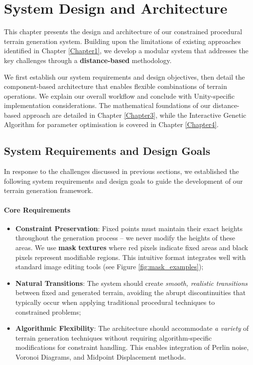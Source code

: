 \chapter{System Design and Architecture}
\label{Chapter2}

This chapter presents the design and architecture of our constrained procedural terrain generation system. Building upon the limitations of existing approaches identified in Chapter \ref{Chapter1}, we develop a modular system that addresses the key challenges through a \textbf{distance-based} methodology.

We first establish our system requirements and design objectives, then detail the component-based architecture that enables flexible combinations of terrain operations. We explain our overall workflow and conclude with Unity-specific implementation considerations. The mathematical foundations of our distance-based approach are detailed in Chapter \ref{Chapter3}, while the Interactive Genetic Algorithm for parameter optimisation is covered in Chapter \ref{Chapter4}.

\section{System Requirements and Design Goals}

In response to the challenges discussed in previous sections, we established the following system requirements and design goals to guide the development of our terrain generation framework.

\subsubsection{Core Requirements}

\begin{itemize}
    \item \textbf{Constraint Preservation}: Fixed points must maintain their exact heights throughout the generation process -- we never modify the heights of these areas. We use \textbf{mask} \textbf{textures} where red pixels indicate fixed areas and black pixels represent modifiable regions. This intuitive format integrates well with standard image editing tools (see Figure \ref{fig:mask_examples});

    \item \textbf{Natural Transitions}: The system should create \textit{smooth, realistic transitions} between fixed and generated terrain, avoiding the abrupt discontinuities that typically occur when applying traditional procedural techniques to constrained problems; 

    \item \textbf{Algorithmic Flexibility}: The architecture should accommodate \textit{a variety} of terrain generation techniques without requiring algorithm-specific modifications for constraint handling. This enables integration of Perlin noise, Voronoi Diagrams, and Midpoint Displacement methods.
    
\end{itemize}

